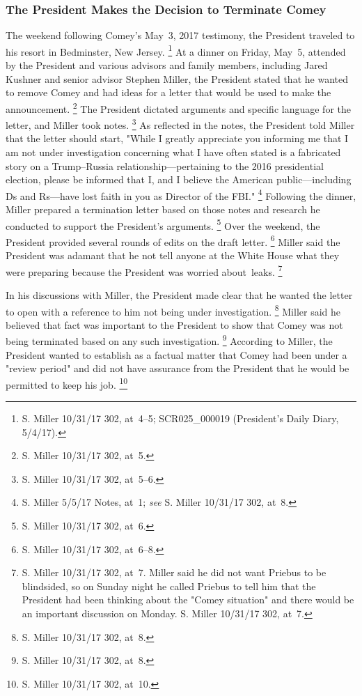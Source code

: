 \subsubsection{The President Makes the Decision to Terminate Comey}

The weekend following Comey's May~3, 2017 testimony, the President traveled to his resort in Bedminster, New Jersey.%
\footnote{S. Miller 10/31/17 302, at~4--5;
SCR025\_000019 (President's Daily Diary, 5/4/17).}
At a dinner on Friday, May~5, attended by the President and various advisors and family members, including Jared Kushner and senior advisor Stephen Miller, the President stated that he wanted to remove Comey and had ideas for a letter that would be used to make the announcement.%
\footnote{S. Miller 10/31/17 302, at~5.}
The President dictated arguments and specific language for the letter, and Miller took notes.%
\footnote{S. Miller 10/31/17 302, at~5--6.}
As reflected in the notes, the President told Miller that the letter should start, "While I greatly appreciate you informing me that I am not under investigation concerning what I have often stated is a fabricated story on a Trump--Russia relationship---pertaining to the 2016 presidential election, please be informed that I, and I believe the American public---including Ds and Rs---have lost faith in you as Director of the FBI."%
\footnote{S. Miller 5/5/17 Notes, at~1;
\textit{see} S. Miller 10/31/17 302, at~8.}
Following the dinner, Miller prepared a termination letter based on those notes and research he conducted to support the President's arguments.%
\footnote{S. Miller 10/31/17 302, at~6.}
Over the weekend, the President provided several rounds of edits on the draft letter.%
\footnote{S. Miller 10/31/17 302, at~6--8.}
Miller said the President was adamant that he not tell anyone at the White House what they were preparing because the President was worried about~leaks.%
\footnote{S. Miller 10/31/17 302, at~7.
Miller said he did not want Priebus to be blindsided, so on Sunday night he called Priebus to tell him that the President had been thinking about the "Comey situation" and there would be an important discussion on Monday.
S. Miller 10/31/17 302, at~7.}

In his discussions with Miller, the President made clear that he wanted the letter to open with a reference to him not being under investigation.%
\footnote{S. Miller 10/31/17 302, at~8.}
Miller said he believed that fact was important to the President to show that Comey was not being terminated based on any such investigation.%
\footnote{S. Miller 10/31/17 302, at~8.}
According to Miller, the President wanted to establish as a factual matter that Comey had been under a "review period" and did not have assurance from the President that he would be permitted to keep his job.%
\footnote{S. Miller 10/31/17 302, at~10.}


